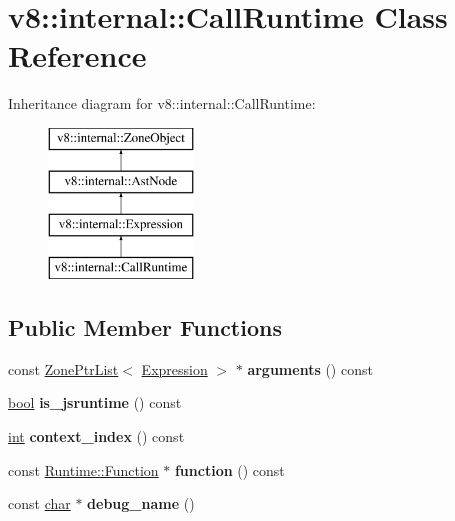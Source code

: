 \hypertarget{classv8_1_1internal_1_1CallRuntime}{}\section{v8\+:\+:internal\+:\+:Call\+Runtime Class Reference}
\label{classv8_1_1internal_1_1CallRuntime}
Inheritance diagram for v8\+:\+:internal\+:\+:Call\+Runtime\+:\begin{figure}[H]
\begin{center}
\leavevmode
\includegraphics[height=4.000000cm]{classv8_1_1internal_1_1CallRuntime}
\end{center}
\end{figure}
\subsection*{Public Member Functions}
\begin{DoxyCompactItemize}
\item 
\mbox{\label{classv8_1_1internal_1_1CallRuntime_a15e44ee87021b34cd70a0600e3f1c130}} 
const \mbox{\hyperlink{classv8_1_1internal_1_1ZoneList}{Zone\+Ptr\+List}}$<$ \mbox{\hyperlink{classv8_1_1internal_1_1Expression}{Expression}} $>$ $\ast$ {\bfseries arguments} () const
\item 
\mbox{\label{classv8_1_1internal_1_1CallRuntime_abc5bb91d3e1dcba4f0919ab66afdc2ac}} 
\mbox{\hyperlink{classbool}{bool}} {\bfseries is\+\_\+jsruntime} () const
\item 
\mbox{\label{classv8_1_1internal_1_1CallRuntime_a10f04afaafc871f0d05aad3a825f7692}} 
\mbox{\hyperlink{classint}{int}} {\bfseries context\+\_\+index} () const
\item 
\mbox{\label{classv8_1_1internal_1_1CallRuntime_aa33d50898ad2b46d07b3db547fa3f844}} 
const \mbox{\hyperlink{structv8_1_1internal_1_1Runtime_1_1Function}{Runtime\+::\+Function}} $\ast$ {\bfseries function} () const
\item 
\mbox{\label{classv8_1_1internal_1_1CallRuntime_a510fff5ac6b5975378e2bfd10047cd6e}} 
const \mbox{\hyperlink{classchar}{char}} $\ast$ {\bfseries debug\+\_\+name} ()
\end{DoxyCompactItemize}
